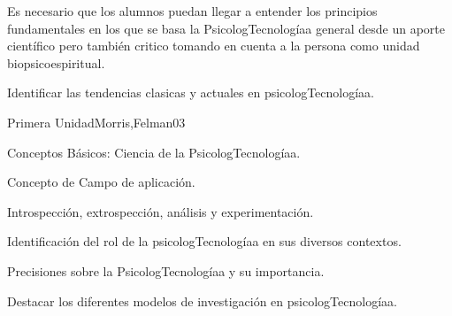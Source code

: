 \begin{syllabus}


\begin{justification}
Es necesario que los alumnos puedan llegar a entender los principios fundamentales en  los que se basa la PsicologTecnologíaa general desde un aporte científico pero también critico tomando en cuenta a la persona como unidad biopsicoespiritual.
\end{justification}

\begin{goals}
\item Identificar las tendencias clasicas y actuales en psicologTecnologíaa.
\end{goals}

\begin{outcomes}
\end{outcomes}

\begin{unit}{Primera Unidad}{Morris,Felman}{0}{3}
\begin{topics}
	\item Conceptos Básicos: Ciencia de la PsicologTecnologíaa.
	\item Concepto de Campo de aplicación.
	\item Introspección, extrospección, análisis y experimentación.
\end{topics}
\begin{learningoutcomes}
	\item Identificación del rol de la psicologTecnologíaa en sus diversos contextos.
	\item Precisiones sobre la PsicologTecnologíaa y su importancia.
	\item Destacar los diferentes modelos de investigación en psicologTecnologíaa.
\end{learningoutcomes}
\end{unit}


\end{syllabus}
